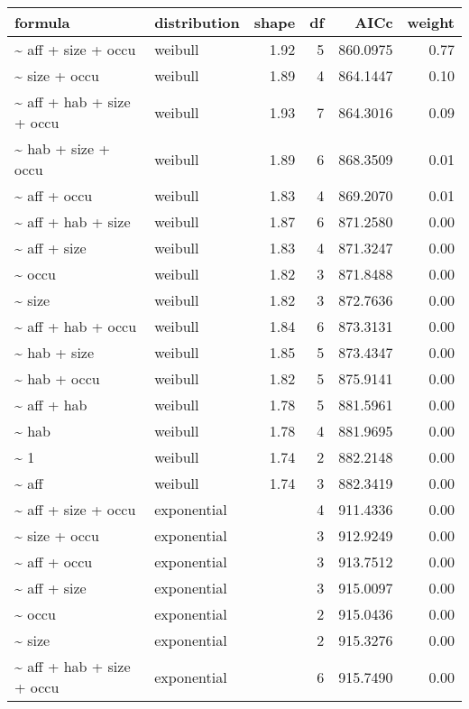 \begin{table}[ht]
\centering
\begin{tabular}{llrrrr}
 formula & distribution & shape & df & AICc & weight \\ 
  \hline
\~{} aff + size + occu & weibull & 1.92 & 5 & 860.0975 & 0.77 \\ 
  \~{} size + occu & weibull & 1.89 & 4 & 864.1447 & 0.10 \\ 
  \~{} aff + hab + size + occu & weibull & 1.93 & 7 & 864.3016 & 0.09 \\ 
  \~{} hab + size + occu & weibull & 1.89 & 6 & 868.3509 & 0.01 \\ 
  \~{} aff + occu & weibull & 1.83 & 4 & 869.2070 & 0.01 \\ 
  \~{} aff + hab + size & weibull & 1.87 & 6 & 871.2580 & 0.00 \\ 
  \~{} aff + size & weibull & 1.83 & 4 & 871.3247 & 0.00 \\ 
  \~{} occu & weibull & 1.82 & 3 & 871.8488 & 0.00 \\ 
  \~{} size & weibull & 1.82 & 3 & 872.7636 & 0.00 \\ 
  \~{} aff + hab + occu & weibull & 1.84 & 6 & 873.3131 & 0.00 \\ 
  \~{} hab + size & weibull & 1.85 & 5 & 873.4347 & 0.00 \\ 
  \~{} hab + occu & weibull & 1.82 & 5 & 875.9141 & 0.00 \\ 
  \~{} aff + hab & weibull & 1.78 & 5 & 881.5961 & 0.00 \\ 
  \~{} hab & weibull & 1.78 & 4 & 881.9695 & 0.00 \\ 
  \~{} 1 & weibull & 1.74 & 2 & 882.2148 & 0.00 \\ 
  \~{} aff & weibull & 1.74 & 3 & 882.3419 & 0.00 \\ 
  \~{} aff + size + occu & exponential &  & 4 & 911.4336 & 0.00 \\ 
  \~{} size + occu & exponential &  & 3 & 912.9249 & 0.00 \\ 
  \~{} aff + occu & exponential &  & 3 & 913.7512 & 0.00 \\ 
  \~{} aff + size & exponential &  & 3 & 915.0097 & 0.00 \\ 
  \~{} occu & exponential &  & 2 & 915.0436 & 0.00 \\ 
  \~{} size & exponential &  & 2 & 915.3276 & 0.00 \\ 
  \~{} aff + hab + size + occu & exponential &  & 6 & 915.7490 & 0.00 \\ 

\end{tabular}
\end{table}
